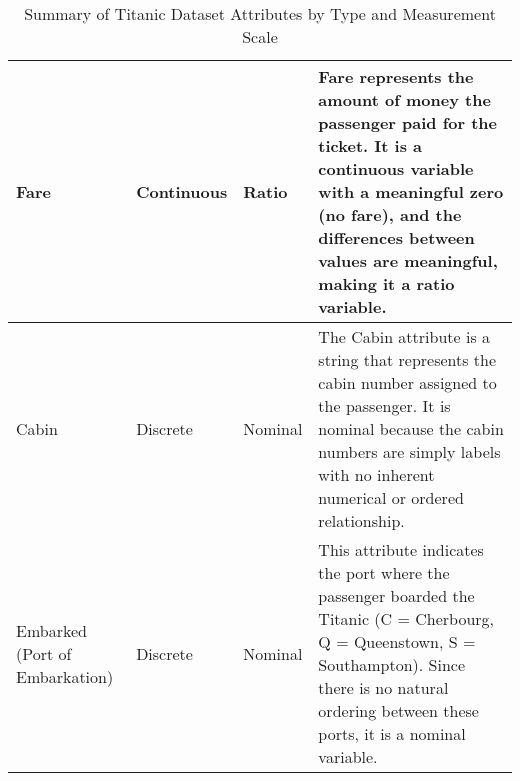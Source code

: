 \documentclass[twoside, 11pt]{article}
\begin{document}
\begin{table}[h!]
\begin{tabular}{|l|l|l|p{8cm}|}
		Fare & Continuous & Ratio & Fare represents the amount of money the passenger paid for the ticket. It is a continuous variable with a meaningful zero (no fare), and the differences between values are meaningful, making it a ratio variable. \\ \hline
		Cabin & Discrete & Nominal & The Cabin attribute is a string that represents the cabin number assigned to the passenger. It is nominal because the cabin numbers are simply labels with no inherent numerical or ordered relationship. \\ \hline
		Embarked (Port of Embarkation) & Discrete & Nominal & This attribute indicates the port where the passenger boarded the Titanic (C = Cherbourg, Q = Queenstown, S = Southampton). Since there is no natural ordering between these ports, it is a nominal variable. \\ \hline
	\end{tabular}
	\caption{Summary of Titanic Dataset Attributes by Type and Measurement Scale}
	\label{table:description}
\end{table}
\end{document}

